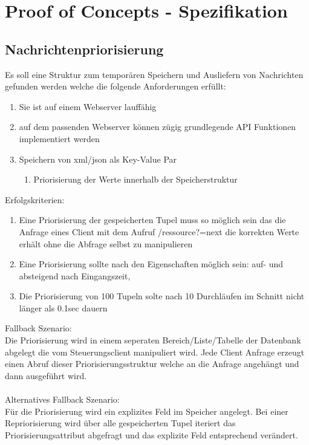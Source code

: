 \documentclass[11pt,oneside,a4paper,notitlepage]{article}
\begin{document}
%
\section{Proof of Concepts - Spezifikation}
%
\subsection{Nachrichtenpriorisierung}
Es soll eine Struktur zum temporären Speichern und Ausliefern von Nachrichten gefunden werden welche die folgende Anforderungen erfüllt:

\begin{enumerate}
\item Sie ist auf einem Webserver lauffähig
\item auf dem passenden Webserver können zügig grundlegende API Funktionen implementiert werden
\item Speichern von xml/json als Key-Value Par
\begin{enumerate}
\item Priorisierung der Werte innerhalb der Speicherstruktur
\end{enumerate}
\end{enumerate}
\noindent
Erfolgskriterien:
\begin{enumerate}
\item Eine Priorisierung der gespeicherten Tupel muss so möglich sein das die Anfrage eines Client mit dem Aufruf /ressource?=next die korrekten Werte erhält ohne die Abfrage selbst zu manipulieren
\item Eine Priorisierung sollte nach den Eigenschaften möglich sein: auf- und absteigend nach Eingangszeit, 
\item Die Priorisierung von 100 Tupeln solte nach 10 Durchläufen im Schnitt nicht länger als 0.1sec dauern
\end{enumerate}
\noindent

%
Fallback Szenario:\\
Die Priorisierung wird in einem seperaten Bereich/Liste/Tabelle der Datenbank abgelegt die vom Steuerungsclient manipuliert wird.
Jede Client Anfrage erzeugt einen Abruf dieser Priorisierungsstruktur welche an die Anfrage angehängt und dann ausgeführt wird.\\
\\
Alternatives Fallback Szenario:\\
Für die Priorisierung wird ein explizites Feld im Speicher angelegt. Bei einer Repriorisierung wird über alle gespeicherten Tupel 
iteriert das Priorisierungsattribut abgefragt und das explizite Feld entsprechend verändert.\\
%
\end{document}
